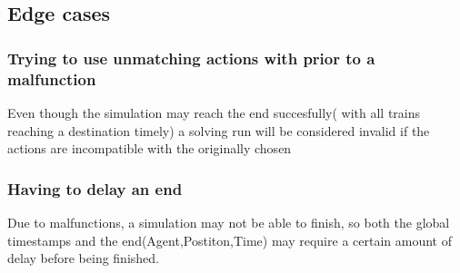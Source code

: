 \subsection{Edge cases}

\subsubsection {Trying to use unmatching actions with prior to a malfunction} Even though the simulation may reach the end succesfully( with all trains reaching a destination timely) a solving run will be considered invalid if the actions are incompatible with the originally chosen

\subsubsection {Having to delay an end} Due to malfunctions, a simulation may not be able to finish, so both the global timestamps and the end(Agent,Postiton,Time) may require a certain amount of delay before being finished.

